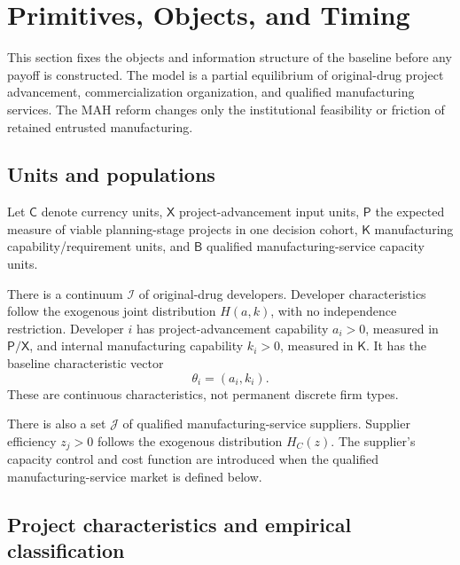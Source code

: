 \section{Primitives, Objects, and Timing}
\label{sec:p01-primitives-timing}

This section fixes the objects and information structure of the baseline before
any payoff is constructed.  The model is a partial equilibrium of
original-drug project advancement, commercialization organization, and
qualified manufacturing services.  The MAH reform changes only the
institutional feasibility or friction of retained entrusted manufacturing.

\subsection{Units and populations}
\label{subsec:p01-units-populations}

Let \(\mathsf C\) denote currency units, \(\mathsf X\) project-advancement
input units, \(\mathsf P\) the expected measure of viable planning-stage
projects in one decision cohort, \(\mathsf K\) manufacturing
capability/requirement units, and \(\mathsf B\) qualified manufacturing-service
capacity units.

There is a continuum \(\mathcal I\) of original-drug developers.  Developer
characteristics follow the exogenous joint distribution \(H(a,k)\), with
no independence restriction. Developer \(i\)
has project-advancement capability \(a_i>0\), measured in \(\mathsf P/\mathsf X\), and
internal manufacturing capability \(k_i>0\), measured in \(\mathsf K\). It
has the baseline characteristic vector
\begin{equation}
  \theta_i=(a_i,k_i).
  \label{eq:p01-developer-type}
\end{equation}
These are continuous characteristics, not permanent discrete firm types.

There is also a set \(\mathcal J\) of qualified manufacturing-service
suppliers.  Supplier efficiency \(z_j>0\) follows the exogenous distribution
\(H_C(z)\).  The supplier's capacity control and cost function are introduced
when the qualified manufacturing-service market is defined below.

\subsection{Project characteristics and empirical classification}
\label{subsec:p01-projects}

